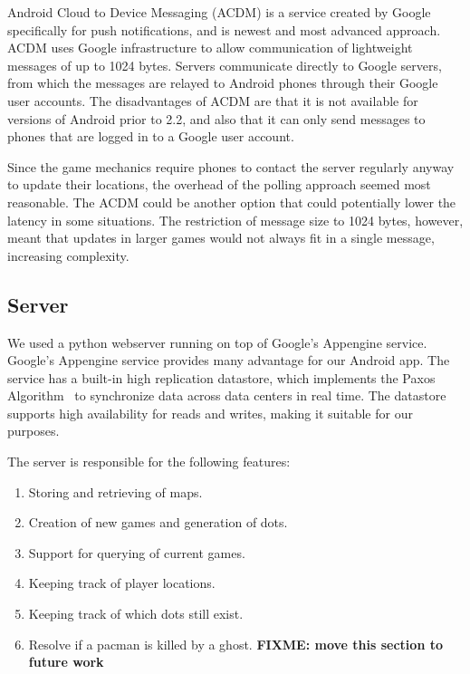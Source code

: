 \documentclass{acm_proc_article-sp}
\newcommand{\FIXME}[1]{{\color{red}\textbf{FIXME: #1}}}
\begin{document}
Android Cloud to Device Messaging (ACDM) is a service created by Google
specifically for push notifications, and is newest and most advanced approach.
ACDM uses Google infrastructure to allow communication of lightweight messages
of up to 1024 bytes. Servers communicate directly to Google servers, from which
the messages are relayed to Android phones through their Google user accounts.
The disadvantages of ACDM are that it is not available for versions of Android
prior to 2.2, and also that it can only send messages to phones that are logged
in to a Google user account.

Since the game mechanics require phones to contact the server regularly anyway
to update their locations, the overhead of the polling approach seemed most
reasonable. The ACDM could be another option that could potentially lower the
latency in some situations. The restriction of message size to 1024 bytes,
however, meant that updates in larger games would not always fit in a single
message, increasing complexity.


\subsection{Server}

We used a python webserver running on top of Google's Appengine
service. Google's Appengine service provides many advantage for our
Android app. The service has a built-in high replication datastore,
which implements the Paxos Algorithm~\cite{lamport01paxos} to
synchronize data across data centers in real time. The datastore
supports high availability for reads and writes, making it suitable
for our purposes.

The server is responsible for the following features:
\begin{enumerate}
\item Storing and retrieving of maps.
\item Creation of new games and generation of dots.
\item Support for querying of current games.
\item Keeping track of player locations.
\item Keeping track of which dots still exist.
\item Resolve if a pacman is killed by a ghost. \FIXME{move this section to future work}
\end{enumerate}
\end{document}
